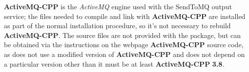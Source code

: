 \tertiaryEnd
\secondaryEnd
{}
\textbf{ActiveMQ-CPP} is the \emph{ActiveMQ} engine used with the SendToMQ output service;
the files needed to compile and link with \textbf{ActiveMQ-CPP} are installed as part of
the normal \mplusm{} installation procedure, so it's not necessary to rebuild
\textbf{ActiveMQ-CPP}.
The source files are not provided with the  package, but can be obtained
via the instructions on the web\longDash{}page
%
{\textbf{ActiveMQ-CPP} source code}, as \mplusm{} does not use a modified version of
\textbf{ActiveMQ-CPP} and does not depend on a particular version \longDash{} other than
it must be at least \textbf{ActiveMQ-CPP} \textbf{3.8}.\\

